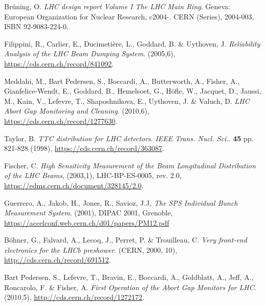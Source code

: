 %
{\printbibliography}{

    \begin{thebibliography}{99}
	
         Br\"uning, O. \emph{LHC design report Volume I The LHC
            Main Ring}. Geneva: European Organization for Nuclear Research, c2004-. CERN
            (Series), 2004-003, ISBN 92-9083-224-0.

         Filippini, R., Carlier, E., Ducimetière, L., Goddard,
            B. \& Uythoven, J. \emph{Reliability Analysis of the LHC Beam Dumping System}.
            (2005,6), \url{https://cds.cern.ch/record/841092}.

        Meddahi, M., Bart Pedersen, S., Boccardi, A.,
            Butterworth, A., Fisher, A., Gianfelice-Wendt, E., Goddard, B., Hemelsoet,
            G., Höfle, W., Jacquet, D., Jaussi, M., Kain, V., Lefevre, T., Shaposhnikova,
            E., Uythoven, J. \& Valuch, D. \emph{LHC Abort Gap Monitoring and Cleaning}.
            (2010,6), \url{https://cds.cern.ch/record/1277630}.

         Taylor, B. \emph{TTC distribution for LHC detectors}.
            {\em IEEE Trans. Nucl. Sci.}. \textbf{45} pp. 821-828 (1998),
            \url{https://cds.cern.ch/record/363087}.

         Fischer, C.  \emph{High Sensitivity
            Measurement of the Beam Longitudinal Distribution of the LHC Beams}, 
            (2003,1), LHC-BP-ES-0005, rev. 2.0,
            \url{https://edms.cern.ch/document/328145/2.0}.
   
         Guerrero, A., Jakob, H., Jones, R., Savioz, J.J,
        \emph{The SPS Individual Bunch Measurement System}. (2001), DIPAC 2001, Grenoble, \url{https://accelconf.web.cern.ch/d01/papers/PM12.pdf}

         Böhner, G., Falvard, A., Lecoq, J., Perret, P. \& Trouilleau,
            C. \emph{Very front-end electronics for the LHCb preshower}. (CERN, 2000, 10), \url{http://cds.cern.ch/record/691512}.

        Bart Pedersen, S., Lefevre, T., Bravin, E., Boccardi, A.,
          Goldblatt, A., Jeff, A., Roncarolo, F. \& Fisher, A. \emph{First Operation of
          the Abort Gap Monitors for LHC}.  (2010,5), \url{http://cds.cern.ch/record/1272172}.


\end{thebibliography}}
